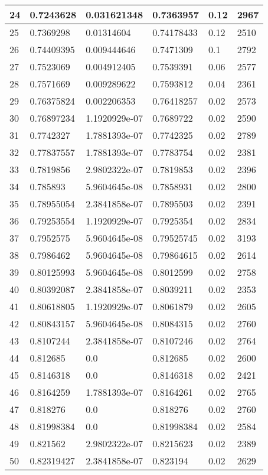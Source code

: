 \begin{longtable}{|l|l|l|l|l|l|}
24 & 0.7243628 & 0.031621348 & 0.7363957 & 0.12 & 2967 \\ \hline 
25 & 0.7369298 & 0.01314604 & 0.74178433 & 0.12 & 2510 \\ \hline 
26 & 0.74409395 & 0.009444646 & 0.7471309 & 0.1 & 2792 \\ \hline 
27 & 0.7523069 & 0.004912405 & 0.7539391 & 0.06 & 2577 \\ \hline 
28 & 0.7571669 & 0.009289622 & 0.7593812 & 0.04 & 2361 \\ \hline 
29 & 0.76375824 & 0.002206353 & 0.76418257 & 0.02 & 2573 \\ \hline 
30 & 0.76897234 & 1.1920929e-07 & 0.7689722 & 0.02 & 2590 \\ \hline 
31 & 0.7742327 & 1.7881393e-07 & 0.7742325 & 0.02 & 2789 \\ \hline 
32 & 0.77837557 & 1.7881393e-07 & 0.7783754 & 0.02 & 2381 \\ \hline 
33 & 0.7819856 & 2.9802322e-07 & 0.7819853 & 0.02 & 2396 \\ \hline 
34 & 0.785893 & 5.9604645e-08 & 0.7858931 & 0.02 & 2800 \\ \hline 
35 & 0.78955054 & 2.3841858e-07 & 0.7895503 & 0.02 & 2391 \\ \hline 
36 & 0.79253554 & 1.1920929e-07 & 0.7925354 & 0.02 & 2834 \\ \hline 
37 & 0.7952575 & 5.9604645e-08 & 0.79525745 & 0.02 & 3193 \\ \hline 
38 & 0.7986462 & 5.9604645e-08 & 0.79864615 & 0.02 & 2614 \\ \hline 
39 & 0.80125993 & 5.9604645e-08 & 0.8012599 & 0.02 & 2758 \\ \hline 
40 & 0.80392087 & 2.3841858e-07 & 0.8039211 & 0.02 & 2353 \\ \hline 
41 & 0.80618805 & 1.1920929e-07 & 0.8061879 & 0.02 & 2605 \\ \hline 
42 & 0.80843157 & 5.9604645e-08 & 0.8084315 & 0.02 & 2760 \\ \hline 
43 & 0.8107244 & 2.3841858e-07 & 0.8107246 & 0.02 & 2764 \\ \hline 
44 & 0.812685 & 0.0 & 0.812685 & 0.02 & 2600 \\ \hline 
45 & 0.8146318 & 0.0 & 0.8146318 & 0.02 & 2421 \\ \hline 
46 & 0.8164259 & 1.7881393e-07 & 0.8164261 & 0.02 & 2765 \\ \hline 
47 & 0.818276 & 0.0 & 0.818276 & 0.02 & 2760 \\ \hline 
48 & 0.81998384 & 0.0 & 0.81998384 & 0.02 & 2584 \\ \hline 
49 & 0.821562 & 2.9802322e-07 & 0.8215623 & 0.02 & 2389 \\ \hline 
50 & 0.82319427 & 2.3841858e-07 & 0.823194 & 0.02 & 2629 \\ \hline 
\end{longtable}